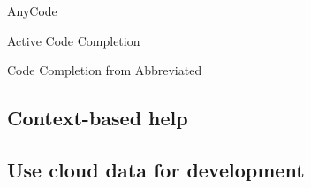 \documentclass{sigchi}
\begin{document}
AnyCode\cite{Gvero:2015:SJE:2814270.2814295}

Active Code Completion\cite{Omar:2012:ACC:2337223.2337324}

Code Completion from Abbreviated\cite{Han:2009:CCA:1747491.1747530}



\subsection{Context-based help}

\subsection{Use cloud data for development}
\end{document}
